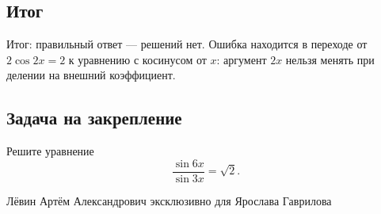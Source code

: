 \documentclass[12pt,a4paper]{article}
\begin{document}
\subsection*{Итог}
\textcolor{teal!60!black}{Итог:} правильный ответ --- решений нет. Ошибка находится в переходе от $2\cos 2x=2$ к уравнению с косинусом от $x$: аргумент $2x$ нельзя менять при делении на внешний коэффициент.

\subsection*{Задача на закрепление}
Решите уравнение
\[
\frac{\sin 6x}{\sin 3x}=\sqrt{2}.
\]

\vfill
\begin{center}
\small Лёвин Артём Александрович эксклюзивно для Ярослава Гаврилова
\end{center}

\end{document}
